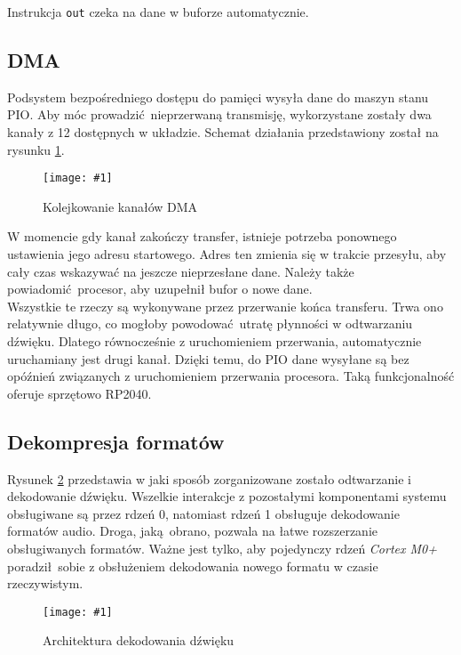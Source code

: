 \documentclass[polish]{aghengthesis}
\newcommand{\imgint}[4]{
	\begin{figure}[{#4}]
		\centering
		\texttt{[image: \#1]}
		\caption{#2}
		\label{#1}
	\end{figure}
}
\newcommand{\imgh}[3]{\imgint{#1}{#2}{#3}{H}}
\begin{document}
			Instrukcja \lstinline|out| czeka na dane w buforze automatycznie.
		
		\subsection{DMA}
			Podsystem bezpośredniego dostępu do pamięci wysyła dane do maszyn stanu PIO. Aby móc prowadzić nieprzerwaną transmisję, wykorzystane zostały dwa kanały z 12 dostępnych w układzie. Schemat działania przedstawiony został na rysunku \ref{3/dma_chain}.
			\imgh{3/dma_chain}{Kolejkowanie kanałów DMA}{0.55}
			
			W momencie gdy kanał zakończy transfer, istnieje potrzeba ponownego ustawienia jego adresu startowego.
			Adres ten zmienia się w trakcie przesyłu, aby cały czas wskazywać na jeszcze nieprzesłane dane.
			Należy także powiadomić procesor, aby uzupełnił bufor o nowe dane.
			$ $\\
			
			Wszystkie te rzeczy są wykonywane przez przerwanie końca transferu.
			Trwa ono relatywnie długo, co mogłoby powodować utratę płynności w odtwarzaniu dźwięku.
			Dlatego równocześnie z uruchomieniem przerwania, automatycznie uruchamiany jest drugi kanał.
			Dzięki temu, do PIO dane wysyłane są bez opóźnień związanych z uruchomieniem przerwania procesora.
			Taką funkcjonalność oferuje sprzętowo RP2040.
		
		\subsection{Dekompresja formatów}
			\label{sec:decode}
			
			Rysunek \ref{3/PicoRadio-sound-decoding} przedstawia w jaki sposób zorganizowane zostało odtwarzanie i dekodowanie dźwięku. Wszelkie interakcje z pozostałymi komponentami systemu obsługiwane są przez rdzeń 0, natomiast rdzeń 1 obsługuje dekodowanie formatów audio. Droga, jaką obrano, pozwala na łatwe rozszerzanie obsługiwanych formatów. Ważne jest tylko, aby pojedynczy rdzeń \textit{Cortex M0+} poradził sobie z obsłużeniem dekodowania nowego formatu w czasie rzeczywistym.
			\imgh{3/PicoRadio-sound-decoding}{Architektura dekodowania dźwięku}{0.95}
			
		
\end{document}
